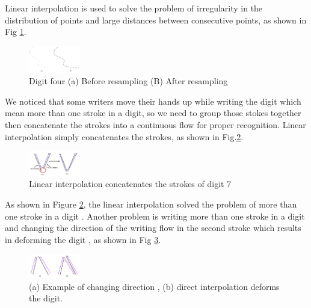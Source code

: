 \documentclass[times, 10pt,twocolumn]{article}
\begin{document}
Linear interpolation\cite{Pastor2005} is used to solve the problem of irregularity in the distribution of points and large distances between consecutive points, as shown in Fig \ref{fig:pre1}.

 \begin{figure}
 \centering
 \includegraphics[width=0.2\textwidth]{pre1}
\caption{Digit four (a) Before resampling  (B) After resampling}
 \label{fig:pre1}
 \end{figure}

We noticed that some writers move their hands up while writing the digit which mean more than one stroke in a digit, so we need to group those stokes together then concatenate the strokes into a continuous flow for proper recognition. Linear interpolation simply concatenates the strokes, as shown in Fig.\ref{fig:pre2}.



 \begin{figure}
 \centering
 \includegraphics[width=0.2\textwidth]{pre2}
\caption{Linear interpolation concatenates the strokes of digit 7 } \label{fig:pre2}
 \end{figure}

 As shown in Figure \ref{fig:pre2}, the linear interpolation solved the problem of more than one stroke in a digit . Another problem is writing more than one stroke in a digit and changing the direction of the writing flow in the second stroke which results in deforming the digit , as shown in Fig \ref{fig:pre3}.
 \begin{figure}
 \centering
 \includegraphics[width=0.2\textwidth]{pre3}
 \caption{ (a) Example of changing direction , (b) direct interpolation deforms the digit.}
  \label{fig:pre3}
  \end{figure}
\end{document}
